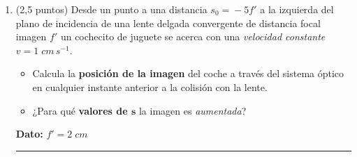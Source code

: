 \documentclass[a4paper,14pt]{extarticle}
\newcommand{\halmos}{
\vspace*{-2ex}

\begin{flushright}
\rule{1mm}{2.5mm} \end{flushright}
\vspace*{-3ex}

}
\renewcommand{\qed}{\halmos}
\begin{document}
\begin{enumerate}
					\textbf{Dato}: $n_{\text{hielo}}\simeq 1.3$		
			 \qed
    
    \item (2,5 puntos) Desde un punto a una distancia $s_0\!=\!-5f'$ a la izquierda del plano de incidencia de una lente delgada convergente de distancia focal imagen $f'$ un cochecito de juguete se acerca con una \textit{velocidad constante} $v=1\;cm\,s^{-1}$. 
			\begin{itemize}
				\item[a)] Calcula la \textbf{posición de la imagen} del coche a través del sistema óptico en cualquier instante anterior a la colisión con la lente.
				\item[b)] ¿Para qué \textbf{valores de $\mathbf{s}$} la imagen es \textit{aumentada}? 
			\end{itemize}
			
					\textbf{Dato:} $f'=2\;cm$
				
			\qed

    
\end{enumerate}
\end{document}
